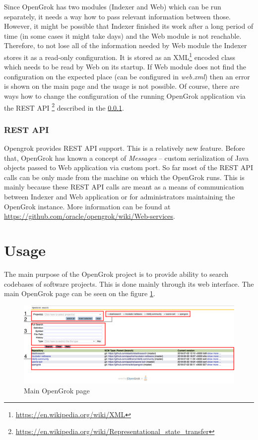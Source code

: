 Since OpenGrok has two modules (Indexer and Web) which can be run separately, it needs a way how to pass relevant
information between those. However, it might be possible that Indexer finished its work after a long period of time
(in some cases it might take days) and the Web module is not reachable. Therefore, to not lose all of the information
needed by Web module the Indexer stores it as a read-only configuration. It is stored as an
XML\footnote{\url{https://en.wikipedia.org/wiki/XML}} encoded class which needs to be read by Web on its startup.
If Web module does not find the configuration on the expected place (can be configured in \textit{web.xml}) then an
error is shown on the main page and the usage is not possible. Of course, there are ways how to change the configuration
of the running OpenGrok application via the REST API \footnote{\url{https://en.wikipedia.org/wiki/Representational\_state\_transfer}}
described in the \ref{opengrok_rest}.

\subsubsection{REST API}
\label{opengrok_rest}

Opengrok provides REST API support. This is a relatively new feature. Before that, OpenGrok has known a concept of
\textit{Messages} – custom serialization of Java objects passed to Web application via custom port.
So far most of the REST API calls can be only made from the machine on which the OpenGrok runs.
This is mainly because these REST API calls are meant as a means of communication between Indexer and Web application
or for administrators maintaining the OpenGrok instance. More information can be found at
\url{https://github.com/oracle/opengrok/wiki/Web-services}.

\section{Usage}
\label{opengrok_usage}
The main purpose of the OpenGrok project is to provide ability to search codebases of software projects. This is done
mainly through its web interface. The main OpenGrok page can be seen on the figure \ref{opengrok_main}.

\begin{figure}[htbp]
    \centering
    \includegraphics[width=145mm]{../img/opengrok_main.png}
    \caption{Main OpenGrok page}
    \label{opengrok_main}
\end{figure}

